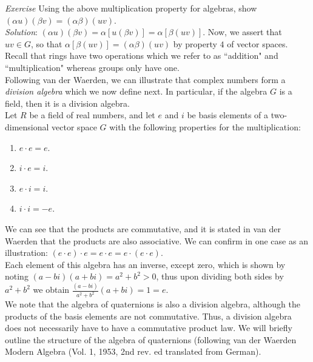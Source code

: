 \textit{Exercise} Using the above multiplication property for algebras, show $\left(\alpha u\right)\left(\beta v\right)=\left(\alpha \beta\right)\left(u v\right)$.\\

\textit{Solution}:  $\left(\alpha u\right)\left(\beta v\right)=\alpha \left[ u \left(\beta v\right)\right]=\alpha \left[ \beta \left(u v\right)\right]$.  Now, we assert that $uv \in G$, so that $\alpha \left[ \beta \left(uv\right) \right]=\left(\alpha \beta\right)\left(uv\right)$ by property $4$ of vector spaces.  Recall that rings have two operations which we refer to as ``addition" and ``multiplication" whereas groups only have one.\\

Following van der Waerden, we can illustrate that complex numbers form a \textit{division algebra} which we now define next.  In particular, if the algebra $G$ is a field, then it is a division algebra.\\

Let $R$ be a field of real numbers, and let $e$ and $i$ be basis elements of a two-dimensional vector space $G$ with the following properties for the multiplication:

\begin{enumerate}
\item $e \cdot e=e$.
\item $i \cdot e = i$.
\item $e \cdot i = i$.
\item $i \cdot i = -e$.
\end{enumerate}

We can see that the products are commutative, and it is stated in van der Waerden that the products are also associative.  We can confirm in one case as an illustration:  $\left(e \cdot e\right) \cdot e= e \cdot e = e \cdot \left(e \cdot e\right)$.\\

Each element of this algebra has an inverse, except zero, which is shown by noting $\left(a-bi\right)\left(a+bi\right)=a^{2}+b^{2} > 0$, thus upon dividing both sides by $a^{2}+b^{2}$ we obtain $\frac{\left(a-bi\right)}{a^{2}+b^{2}}\left(a+bi\right)=1=e$.\\

We note that the algebra of quaternions is also a division algebra, although the products of the basis elements are not commutative.  Thus, a division algebra does not necessarily have to have a commutative product law.  We will briefly outline the structure of the algebra of quaternions (following van der Waerden Modern Algebra (Vol. 1, 1953, 2nd rev. ed translated from German).\\

